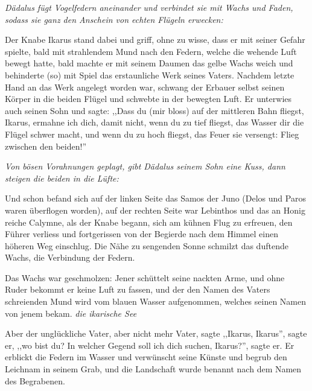 \documentclass[a4paper]{article}
\begin{document}
\textit{Dädalus fügt Vogelfedern aneinander und verbindet sie mit Wachs und Faden, sodass sie ganz den Anschein von echten Flügeln erwecken:}

Der Knabe Ikarus stand dabei und griff, ohne zu wisse, dass er mit seiner Gefahr spielte, bald mit strahlendem Mund nach den Federn, welche die wehende Luft bewegt hatte, bald machte er mit seinem Daumen das gelbe Wachs weich und behinderte (so) mit Spiel das erstaunliche Werk seines Vaters. Nachdem letzte Hand an das Werk angelegt worden war, schwang der Erbauer selbst seinen Körper in die beiden Flügel und schwebte in der bewegten Luft. Er unterwies auch seinen Sohn und sagte: ,,Dass du (mir bloss) auf der mittleren Bahn fliegst, Ikarus, ermahne ich dich, damit nicht, wenn du zu tief fliegst, das Wasser dir die Flügel schwer macht, und wenn du zu hoch fliegst, das Feuer sie versengt: Flieg zwischen den beiden!'' 

\textit{Von bösen Vorahnungen geplagt, gibt Dädalus seinem Sohn eine Kuss, dann steigen die beiden in die Lüfte:}

Und schon befand sich auf der linken Seite das Samos der Juno (Delos und Paros waren überflogen worden), auf der rechten Seite war Lebinthos und das an Honig reiche Calymne, als der Knabe begann, sich am kühnen Flug zu erfreuen, den Führer verliess und fortgerissen von der Begierde nach dem Himmel einen höheren Weg einschlug. Die Nähe zu sengenden Sonne schmilzt das duftende Wachs, die Verbindung der Federn. 

Das Wachs war geschmolzen: Jener schüttelt seine nackten Arme, und ohne Ruder bekommt er keine Luft zu fassen, und der den Namen des Vaters schreienden Mund wird vom blauen Wasser aufgenommen, welches seinen Namen von jenem bekam. \textit{die ikarische See}

Aber der unglückliche Vater, aber nicht mehr Vater, sagte ,,Ikarus, Ikarus'', sagte er, ,,wo bist du? In welcher Gegend soll ich dich suchen, Ikarus?'', sagte er. Er erblickt die Federn im Wasser und verwünscht seine Künste und begrub den Leichnam in seinem Grab, und die Landschaft wurde benannt nach dem Namen des Begrabenen.
\end{document}

